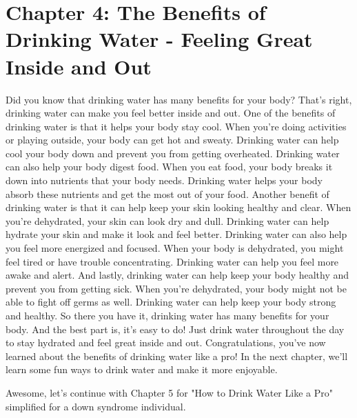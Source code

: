 \chapter{Chapter 4: The Benefits of Drinking Water - Feeling Great Inside and Out
}

Did you know that drinking water has many benefits for
your body? That's right, drinking water can make you feel better inside and
out.
One of the benefits of drinking water is that it helps
your body stay cool. When you're doing activities or playing outside, your body
can get hot and sweaty. Drinking water can help cool your body down and prevent
you from getting overheated.
Drinking water can also help your body digest food.
When you eat food, your body breaks it down into nutrients that your body
needs. Drinking water helps your body absorb these nutrients and get the most
out of your food.
Another benefit of drinking water is that it can help
keep your skin looking healthy and clear. When you're dehydrated, your skin can
look dry and dull. Drinking water can help hydrate your skin and make it look
and feel better.
Drinking water can also help you feel more energized
and focused. When your body is dehydrated, you might feel tired or have trouble
concentrating. Drinking water can help you feel more awake and alert.
And lastly, drinking water can help keep your body
healthy and prevent you from getting sick. When you're dehydrated, your body
might not be able to fight off germs as well. Drinking water can help keep your
body strong and healthy.
So there you have it, drinking water has many benefits
for your body. And the best part is, it's easy to do! Just drink water
throughout the day to stay hydrated and feel great inside and out.
Congratulations, you've now learned about the benefits
of drinking water like a pro! In the next chapter, we'll learn some fun ways to
drink water and make it more enjoyable.
 
Awesome, let's continue with Chapter 5 for "How to Drink Water Like a Pro" simplified for a down syndrome individual.
